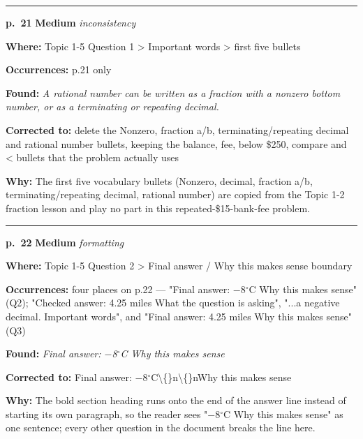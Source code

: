 \documentclass[11pt]{article}
\newcommand{\sevmed}[1]{\textcolor{orange!80!black}{\textbf{#1}}}
\begin{document}
\noindent\rule{\textwidth}{0.4pt}\par\nobreak\vspace{2pt}
\noindent\textbf{p.~21} \quad \sevmed{Medium} \quad \textit{inconsistency}\par
\noindent\textbf{Where: }Topic 1-5 Question 1 > Important words > first five bullets\par
\noindent\textbf{Occurrences: }p.21 only\par
\noindent\textbf{Found: }\textit{A rational number can be written as a fraction with a nonzero bottom number, or as a terminating or repeating decimal.}\par
\noindent\textbf{Corrected to: }delete the Nonzero, fraction a/b, terminating/repeating decimal and rational number bullets, keeping the balance, fee, below \$250, compare and < bullets that the problem actually uses\par
\noindent\textbf{Why: }The first five vocabulary bullets (Nonzero, decimal, fraction a/b, terminating/repeating decimal, rational number) are copied from the Topic 1-2 fraction lesson and play no part in this repeated-\$15-bank-fee problem.\par\vspace{4pt}
\noindent\rule{\textwidth}{0.4pt}\par\nobreak\vspace{2pt}
\noindent\textbf{p.~22} \quad \sevmed{Medium} \quad \textit{formatting}\par
\noindent\textbf{Where: }Topic 1-5 Question 2 > Final answer / Why this makes sense boundary\par
\noindent\textbf{Occurrences: }four places on p.22 --- "Final answer: $-$8$^\circ$C Why this makes sense" (Q2); "Checked answer: 4.25 miles What the question is asking", "...a negative decimal. Important words", and "Final answer: 4.25 miles Why this makes sense" (Q3)\par
\noindent\textbf{Found: }\textit{Final answer: $-$8$^\circ$C Why this makes sense}\par
\noindent\textbf{Corrected to: }Final answer: $-$8$^\circ$C\textbackslash\{\}n\textbackslash\{\}nWhy this makes sense\par
\noindent\textbf{Why: }The bold section heading runs onto the end of the answer line instead of starting its own paragraph, so the reader sees "$-$8$^\circ$C Why this makes sense" as one sentence; every other question in the document breaks the line here.\par\vspace{4pt}
\end{document}
